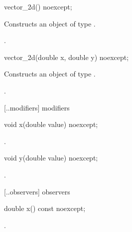 \begin{itemdecl}
vector_2d() noexcept;
\end{itemdecl}
\begin{itemdescr}
	\pnum
	\effects
	Constructs an object of type .
	
	\pnum
	\postconditions
	.
\end{itemdescr}

\begin{itemdecl}
vector_2d(double x, double y) noexcept;
\end{itemdecl}
\begin{itemdescr}
	\pnum
	\effects
	Constructs an object of type .
	
	\pnum
	\postconditions
	.
\end{itemdescr}
	
 [\iotwod.\vectortwod.modifiers]{ modifiers}

\begin{itemdecl}
void x(double value) noexcept;
\end{itemdecl}
\begin{itemdescr}
	\pnum
	\postconditions
	.
	
\end{itemdescr}

\begin{itemdecl}
    void y(double value) noexcept;
\end{itemdecl}
\begin{itemdescr}
	\pnum
	\postconditions
	.
	
\end{itemdescr}

 [\iotwod.\vectortwod.observers]{ observers}

\begin{itemdecl}
    double x() const noexcept;
\end{itemdecl}
\begin{itemdescr}
	\pnum
	\returns
	.
\end{itemdescr}

